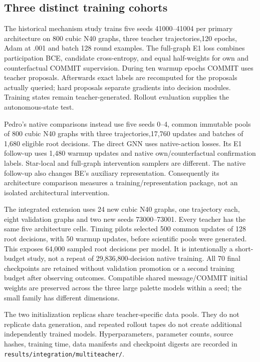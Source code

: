 \documentclass[
  11pt,
]{article}
\begin{document}
\subsection{Three distinct training
cohorts}\label{three-distinct-training-cohorts}

The historical mechanism study trains five seeds 41000--41004 per
primary architecture on 800 cubic N40 graphs, three teacher
trajectories,120 epochs, Adam at .001 and batch 128 round examples. The
full-graph E1 loss combines participation BCE, candidate cross-entropy,
and equal half-weights for own and counterfactual COMMIT supervision.
During ten warmup epochs COMMIT uses teacher proposals. Afterwards exact
labels are recomputed for the proposals actually queried; hard proposals
separate gradients into decision modules. Training states remain
teacher-generated. Rollout evaluation supplies the autonomous-state
test.

Pedro's native comparisons instead use five seeds 0--4, common immutable
pools of 800 cubic N40 graphs with three trajectories,17,760 updates and
batches of 1,680 eligible root decisions. The direct GNN uses
native-action losses. Its E1 follow-up uses 1,480 warmup updates and
native own/counterfactual confirmation labels. Star-local and full-graph
intervention samplers are different. The native follow-up also changes
BE's auxiliary representation. Consequently its architecture comparison
measures a training/representation package, not an isolated
architectural intervention.

The integrated extension uses 24 new cubic N40 graphs, one trajectory
each, eight validation graphs and two new seeds 73000--73001. Every
teacher has the same five architecture cells. Timing pilots selected 500
common updates of 128 root decisions, with 50 warmup updates, before
scientific pools were generated. This exposes 64,000 sampled root
decisions per model. It is intentionally a short-budget study, not a
repeat of 29,836,800-decision native training. All 70 final checkpoints
are retained without validation promotion or a second training budget
after observing outcomes. Compatible shared message/COMMIT initial
weights are preserved across the three large palette models within a
seed; the small family has different dimensions.

The two initialization replicas share teacher-specific data pools. They
do not replicate data generation, and repeated rollout tapes do not
create additional independently trained models. Hyperparameters,
parameter counts, source hashes, training time, data manifests and
checkpoint digests are recorded in
\texttt{results/integration/multiteacher/}.
\end{document}
